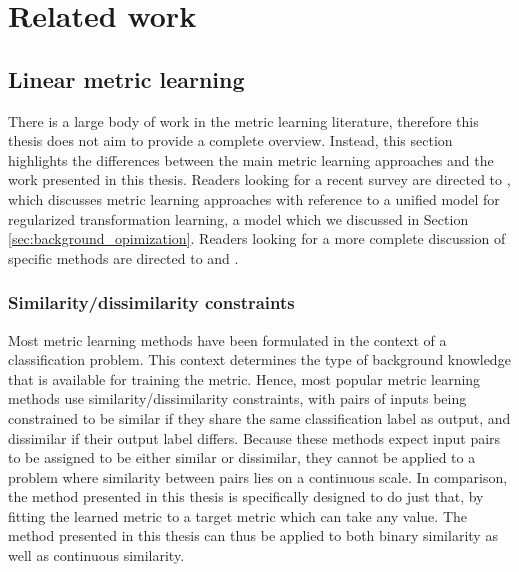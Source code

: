 \chapter{Related work}


\section{Linear metric learning}

There is a large body of work in the metric learning literature, therefore this thesis does not aim to provide a complete overview. Instead, this section highlights the differences between the main metric learning approaches and the work presented in this thesis. Readers looking for a recent survey are directed to \cite{kulis2012metric}, which discusses metric learning approaches with reference to a unified model for regularized transformation learning, a model which we discussed in Section \ref{sec:background_opimization}. Readers looking for a more complete discussion of specific methods are directed to \cite{bellet2013survey} and \cite{yang2006distance}.


\subsection{Similarity/dissimilarity constraints}

Most metric learning methods have been formulated in the context of a classification problem. This context determines the type of background knowledge that is available for training the metric. Hence, most popular metric learning methods use similarity/dissimilarity constraints, with pairs of inputs being constrained to be similar if they share the same classification label as output, and dissimilar if their output label differs. \cite{davis2007information, guillaumin2009you, kostinger2012large} Because these methods expect input pairs to be assigned to be either similar or dissimilar, they cannot be applied to a problem where similarity between pairs lies on a continuous scale. In comparison, the method presented in this thesis is specifically designed to do just that, by fitting the learned metric to a target metric which can take any value. The method presented in this thesis can thus be applied to both binary similarity as well as continuous similarity.


